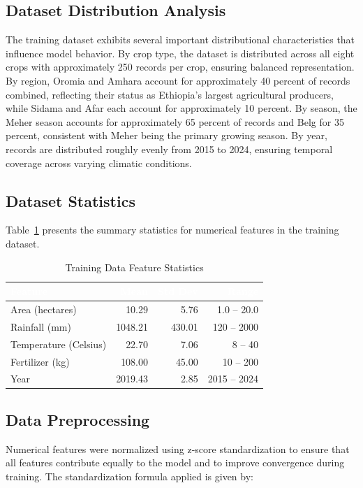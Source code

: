 \documentclass[12pt,a4paper,oneside]{report}
\begin{document}
\subsection{Dataset Distribution Analysis}
The training dataset exhibits several important distributional characteristics that influence model behavior. By crop type, the dataset is distributed across all eight crops with approximately 250 records per crop, ensuring balanced representation. By region, Oromia and Amhara account for approximately 40 percent of records combined, reflecting their status as Ethiopia's largest agricultural producers, while Sidama and Afar each account for approximately 10 percent. By season, the Meher season accounts for approximately 65 percent of records and Belg for 35 percent, consistent with Meher being the primary growing season. By year, records are distributed roughly evenly from 2015 to 2024, ensuring temporal coverage across varying climatic conditions.

\subsection{Dataset Statistics}
Table~\ref{tab:feature-stats} presents the summary statistics for numerical features in the training dataset.

\begin{table}[H]
\centering
\caption{Training Data Feature Statistics}
\label{tab:feature-stats}
\renewcommand{\arraystretch}{1.4}
\begin{tabularx}{\textwidth}{Xrrr}
\toprule
\rowcolor{headerblue}
\textcolor{white}{\textbf{Feature}} & \textcolor{white}{\textbf{Mean}} & \textcolor{white}{\textbf{Std Dev}} & \textcolor{white}{\textbf{Range}} \\
\midrule
Area (hectares) & 10.29 & 5.76 & 1.0 -- 20.0 \\
\rowcolor{rowalt}
Rainfall (mm) & 1048.21 & 430.01 & 120 -- 2000 \\
Temperature (Celsius) & 22.70 & 7.06 & 8 -- 40 \\
\rowcolor{rowalt}
Fertilizer (kg) & 108.00 & 45.00 & 10 -- 200 \\
Year & 2019.43 & 2.85 & 2015 -- 2024 \\
\bottomrule
\end{tabularx}
\end{table}

\subsection{Data Preprocessing}
Numerical features were normalized using z-score standardization to ensure that all features contribute equally to the model and to improve convergence during training. The standardization formula applied is given by:
\end{document}
